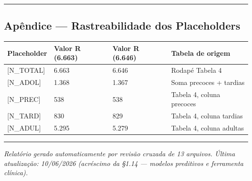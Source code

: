 \documentclass[
]{article}
\begin{document}
\begin{center}\rule{0.5\linewidth}{0.5pt}\end{center}

\hypertarget{apuxeandice-rastreabilidade-dos-placeholders}{%
\subsection{Apêndice --- Rastreabilidade dos
Placeholders}\label{apuxeandice-rastreabilidade-dos-placeholders}}

\begin{longtable}[]{@{}llll@{}}
\toprule
Placeholder & Valor R (6.663) & Valor R (6.646) & Tabela de
origem\tabularnewline
\midrule
\endhead
{[}N\_TOTAL{]} & 6.663 & 6.646 & Rodapé Tabela 4\tabularnewline
{[}N\_ADOL{]} & 1.368 & 1.367 & Soma precoces + tardias\tabularnewline
{[}N\_PREC{]} & 538 & 538 & Tabela 4, coluna precoces\tabularnewline
{[}N\_TARD{]} & 830 & 829 & Tabela 4, coluna tardias\tabularnewline
{[}N\_ADUL{]} & 5.295 & 5.279 & Tabela 4, coluna adultas\tabularnewline
\bottomrule
\end{longtable}

\begin{center}\rule{0.5\linewidth}{0.5pt}\end{center}

\emph{Relatório gerado automaticamente por revisão cruzada de 13
arquivos. Última atualização: 10/06/2026 (acréscimo da §1.14 --- modelos
preditivos e ferramenta clínica).}
\end{document}
